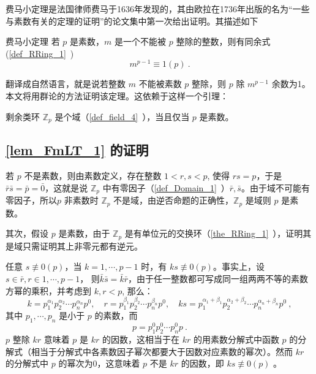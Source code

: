 费马小定理是法国律师费马于1636年发现的，其由欧拉在1736年出版的名为“一些与素数有关的定理的证明”的论文集中第一次给出证明。其描述如下
\begin{theorem}{费马小定理}
若 $p$ 是素数，$m$ 是一个不能被 $p$ 整除的整数，则有同余式(\autoref{def_RRing_1}~)
\begin{equation}
m^{p-1}\equiv 1(p)~.
\end{equation}
\end{theorem}
翻译成自然语言，就是说若整数 $m$ 不能被素数 $p$ 整除，则 $p$ 除 $m^{p-1}$ 余数为1。本文将用群论的方法证明该定理。这依赖于这样一个引理：
\begin{lemma}{}\label{lem_FmLT_1}
剩余类环 $\mathbb Z_p$ 是个域（\autoref{def_field_4}~），当且仅当 $p$ 是素数。
\end{lemma}
\subsection{\autoref{lem_FmLT_1} 的证明}
若 $p$ 不是素数，则由素数定义，存在整数 $1<r,s<p$, 使得 $rs=p$，于是 $\bar r\bar s=\bar p=\bar 0$，这就是说 $\mathbb Z_p$ 中有零因子（\autoref{def_Domain_1}~）$\bar r,\bar s$。由于域不可能有零因子，所以$p$ 非素数时 $\mathbb Z_p$ 不是域，由逆否命题的正确性，$\mathbb Z_p$ 是域则 $p$ 是素数。

其次，假设 $p$ 是素数，由于 $\mathbb Z_p$ 是有单位元的交换环（\autoref{the_RRing_1}~），证明其是域只需证明其上非零元都有逆元。

任意 $s\not\equiv 0(p)$，当 $k=1,\cdots,p-1$ 时，有 $ks\not\equiv 0(p)$。事实上，设 $s\in\bar r, r\in{1,\cdots,p-1}$， 则$\bar k\bar s=\bar k\bar r$，由于任一整数都可写成同一组两两不等的素数方幂的乘积，并考虑到 $k,r<p$, 那么：
\begin{equation}
k=p_1^{\alpha_1}p_2^{\alpha_2}\cdots p_n^{\alpha_n}p^0, \quad r=p_1^{\beta_1}p_2^{\beta_2}\cdots p_n^{\beta_n}p^0,\quad ks=p_1^{\alpha_1+\beta_1}p_2^{\alpha_2+\beta_2}\cdots p_n^{\alpha_n+\beta_n}p^0~,
\end{equation}
其中 $p_1,\cdots,p_n$ 是小于 $p$ 的素数，而
\begin{equation}
p=p_1^0p_2^0\cdots p_n^{0}p~.
\end{equation}
$p$ 整除 $kr$ 意味着 $p$ 是 $kr$ 的因数，这相当于在 $kr$ 的用素数分解式中函数 $p$ 的分解式（相当于分解式中各素数因子幂次都要大于因数对应素数的幂次）。然而 $kr$ 的分解式中 $p$ 的幂次为0，这意味着 $p$ 不是 $kr$ 的因数，即 $ks\not\equiv 0(p)$ 。

